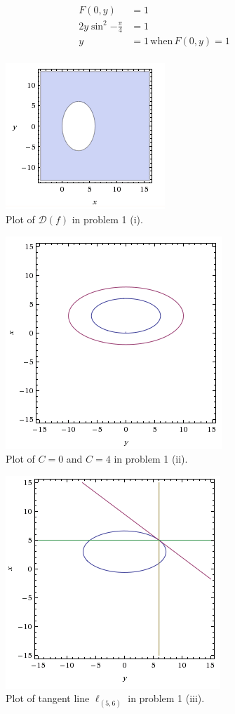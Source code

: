 \documentclass[a4paper,norsk,12pt]{article}
\begin{document}
\begin{align*}
  F(0,y) &= 1 \\
  2y\sin^2{-\frac{\pi}{4}} &= 1\\
  y &= 1 \,\text{when}\, F(0,y)=1\\
\end{align*}

\begin{figure}[h]
  \centering
  \includegraphics{ob1plot.png}
  \caption{Plot of $\mathcal{D}(f)$ in problem 1 (i).}
  \label{plot.p1}
\end{figure}

\begin{figure}[h]
  \centering
  \includegraphics{ob1plot2.png}
  \caption{Plot of $C=0$ and $C=4$ in problem 1 (ii).}
  \label{plot.p2}
\end{figure}

\begin{figure}[h]
  \centering
  \includegraphics{ob1plot3.png}
  \caption{Plot of tangent line $\ell_{(5,6)}$ in problem 1 (iii).}
  \label{plot.p3}
\end{figure}
\end{document}
